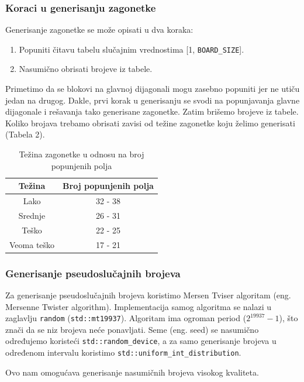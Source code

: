\documentclass[a4paper]{article}
\begin{document}
    \subsubsection{Koraci u generisanju zagonetke}
    Generisanje zagonetke se može opisati u dva koraka:
    \begin{enumerate}
        \item Popuniti čitavu tabelu slučajnim vrednostima [1, \texttt{BOARD\_SIZE}].
        \item Nasumično obrisati brojeve iz tabele.
    \end{enumerate}
    
    \par Primetimo da se blokovi na glavnoj dijagonali mogu zasebno popuniti jer ne utiču jedan na drugog. Dakle, prvi korak u generisanju se svodi na 
    popunjavanja glavne dijagonale i rešavanja tako generisane zagonetke. Zatim brišemo brojeve iz tabele. Koliko brojava trebamo obrisati zavisi od težine zagonetke
    koju želimo generisati (Tabela 2).
    \begin{table}[H]
        \centering
        \begin{tabular}{ | c | c |}
            \hline
            Težina & Broj popunjenih polja \\
            \hline
            Lako & 32 - 38\\
            \hline
            Srednje & 26 - 31\\
            \hline
            Teško & 22 - 25\\
            \hline
            Veoma teško & 17 - 21\\
            \hline
        \end{tabular}
        \caption{Težina zagonetke u odnosu na broj popunjenih polja}
    \end{table}
    \subsubsection{Generisanje pseudoslučajnih brojeva}
    Za generisanje pseudoslučajnih brojeva koristimo Mersen Tviser algoritam (eng. Mersenne Twister algorithm). 
    Implementacija samog algoritma se nalazi u zaglavlju \texttt{random} (\texttt{std::mt19937}). Algoritam ima ogroman period ($2^{19937}-1$), što znači da se niz
    brojeva neće ponavljati. Seme (eng. seed) se nasumično određujemo koristeći \texttt{std::random\_device}, a za samo generisanje brojeva u određenom intervalu
    koristimo \texttt{std::uniform\_int\_distribution}.
    \par Ovo nam omogućava generisanje nasumičnih brojeva visokog kvaliteta.
\end{document}
